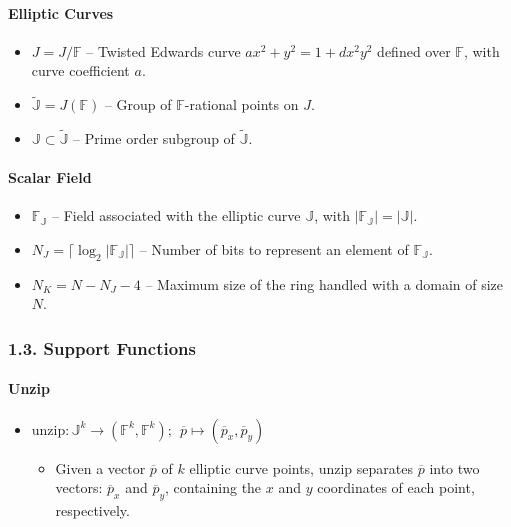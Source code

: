 \documentclass[
]{article}
\providecommand{\tightlist}{%
  \setlength{\itemsep}{0pt}\setlength{\parskip}{0pt}}
\begin{document}
\paragraph{Elliptic Curves}\label{elliptic-curves}

\begin{itemize}
\tightlist
\item
  \(J = J / \mathbb{F}\) -- Twisted Edwards curve
  \(ax^2 + y^2 = 1 + dx^2y^2\) defined over \(\mathbb{F}\), with curve
  coefficient \(a\).
\item
  \(\tilde{\mathbb{J}} = J(\mathbb{F})\) -- Group of
  \(\mathbb{F}\)-rational points on \(J\).
\item
  \(\mathbb{J} \subset \tilde{\mathbb{J}}\) -- Prime order subgroup of
  \(\tilde{\mathbb{J}}\).
\end{itemize}

\paragraph{Scalar Field}\label{scalar-field}

\begin{itemize}
\tightlist
\item
  \(\mathbb{F_J}\) -- Field associated with the elliptic curve
  \(\mathbb{J}\), with \(|\mathbb{F_J}| = |\mathbb{J}|\).
\item
  \(N_J = \lceil \log_2 |\mathbb{F_J}| \rceil\) -- Number of bits to
  represent an element of \(\mathbb{F_J}\).
\item
  \(N_K = N - N_J - 4\) -- Maximum size of the ring handled with a
  domain of size \(N\).
\end{itemize}

\subsubsection{1.3. Support Functions}\label{support-functions}

\paragraph{Unzip}\label{unzip}

\begin{itemize}
\tightlist
\item
  \(\text{unzip}: \mathbb{J}^k \to (\mathbb{F}^k, \mathbb{F}^k);\ \ \overline{p} \mapsto (\overline{p}_x, \overline{p}_y)\)

  \begin{itemize}
  \tightlist
  \item
    Given a vector \(\overline{p}\) of \(k\) elliptic curve points,
    \(\text{unzip}\) separates \(\overline{p}\) into two vectors:
    \(\overline{p}_x\) and \(\overline{p}_y\), containing the \(x\) and
    \(y\) coordinates of each point, respectively.
  \end{itemize}
\end{itemize}
\end{document}
